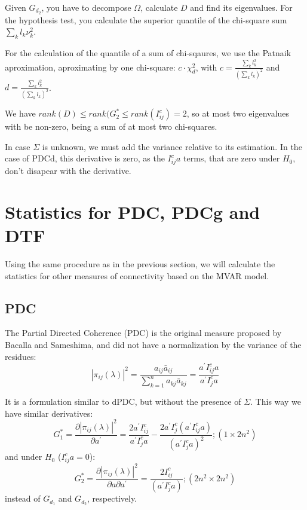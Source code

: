 \documentclass[a4paper,10pt]{article}
\begin{document}
Given $G_{d_2}$, you have to decompose $\Omega$, calculate $D$ and find its eigenvalues. For the hypothesis test, you calculate the superior quantile of the chi-square sum $\sum_{k} {l_{k} \nu_{k}^{2}}$. 

For the calculation of the quantile of a sum of chi-sqaures, we use the Patnaik aproximation, aproximating by one chi-square: $c\cdot \chi^2_d$, with $c = \frac{\sum_k {l_k^2}}{(\sum_k {l_k})^2}$ and $d = \frac{\sum_k {l_k^2}}{(\sum_k {l_k})^2}$.

We have $rank(D) \le rank(G_{2}^{\ast} \le rank(I_{ij}^{c}) = 2$, so at most two eigenvalues with be non-zero, being a sum of at most two chi-squares.

In case $\Sigma$ is unknown, we must add the variance relative to its estimation. In the case of PDCd, this derivative is zero, as the $I_{ij}^{c} a$ terms, that are zero under $H_0$, don't disapear with the derivative.

\section{Statistics for PDC, PDCg and DTF}

Using the same procedure as in the previous section, we will calculate the statistics for other measures of connectivity based on the MVAR model.

\subsection{PDC}

The Partial Directed Coherence (PDC) is the original measure proposed by Bacalla and Sameshima, and did not have a normalization by the variance of the residues:
\begin{equation}
|\pi_{ij}(\lambda)|^{2} = \frac{a_{ij} \bar{a}_{ij}}{\sum_{k=1}^{n}{a_{kj} \bar{a}_{kj}}} = \frac{a^{'} I_{ij}^{c} a}{a^{'} I_{j}^{c} a}
\end{equation}

It is a formulation similar to dPDC, but without the presence of $\Sigma$. This way we have similar derivatives:
\begin{equation}
G_{1}^{\ast} = \frac{\partial |\pi_{ij}(\lambda)|^{2}}{\partial a^{'}} = \frac{2 a^{'} I_{ij}^{c}} {a^{'} I_{j}^{c} a} - \frac{2 a^{'} I_{j}^{c} (a^{'} I_{ij}^{c} a)} {(a^{'} I_{j}^{c} a)^{2}}; (1 \times 2n^{2})
\end{equation}
and under $H_0$ ($I_{ij}^{c} a = 0$):
\begin{equation}
G_{2}^{\ast} = \frac{\partial |\pi_{ij}(\lambda)|^{2}}{\partial a \partial a^{'}} = \frac{2 I_{ij}^{c}}{(a^{'} I_{j}^{c} a)}; (2n^{2} \times 2n^{2})
\end{equation}
instead of $G_{d_1}$ and $G_{d_2}$, respectively.
\end{document}
